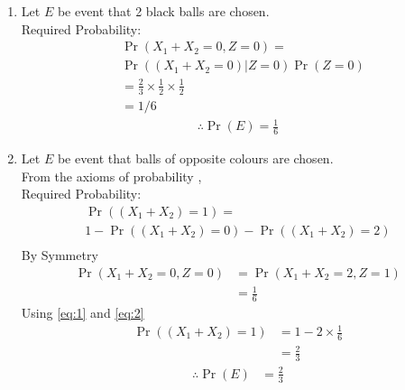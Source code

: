 \documentclass[journal,12pt,twocolumn]{IEEEtran}
\providecommand{\pr}[1]{\ensuremath{\Pr\left(#1\right)}}
\begin{document}
% 		

 
\begin{enumerate}[label =(\alph*)]
\item Let $E$ be event that 2 black balls are chosen.\\
Required Probability:
\begin{align}  
&\pr{X_1+X_2=0,Z=0} =\\ \nonumber
&\pr{ (X_1+X_2=0) | Z=0}\pr{Z=0} \\ \nonumber
&= \frac{2}{3}\times\frac{1}{2}\times\frac{1}{2} \\ \label{eq:1}
&= 1/6 
\end{align}
\begin{align}
\therefore \pr{E} = \frac{1}{6} 
\end{align}
\item Let $E$ be event that balls of opposite colours are chosen.\\
From the axioms of probability ,\\
Required Probability:
\begin{multline}
\pr{(X_1+X_2)=1} = \\
1 - \pr{(X_1+X_2)=0} -\pr{(X_1+X_2)=2}  \\
\end{multline}
By Symmetry 
\begin{align}
\pr{X_1+X_2=0,Z=0} &=\pr{X_1+X_2=2,Z=1}  \label{eq:2} \\
&= \frac{1}{6}  
\end{align}
Using \eqref{eq:1} and \eqref{eq:2}
\begin{align}
\pr{(X_1+X_2)=1} &=1-2\times\frac{1}{6}\\
&=\frac{2}{3}
\end{align}
\begin{align}
\therefore \pr{E} &= \frac{2}{3}
\end{align}
\end{enumerate}
\end{document}
